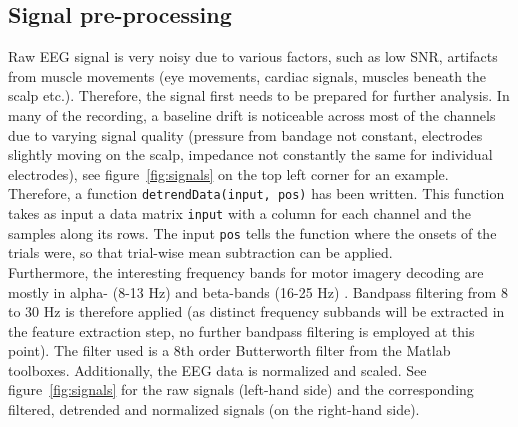 \documentclass[a4paper,oneside, openright,12pt]{report}
\begin{document}
\subsection{Signal pre-processing}
Raw EEG signal is very noisy due to various factors, such as low SNR, artifacts from muscle movements (eye movements, cardiac signals, muscles beneath the scalp etc.). Therefore, the signal first needs to be prepared for further analysis. In many of the recording, a baseline drift is noticeable across most of the channels due to varying signal quality (pressure from bandage not constant, electrodes slightly moving on the scalp, impedance not constantly the same for individual electrodes), see figure~\ref{fig:signals} on the top left corner for an example. Therefore, a function \texttt{detrendData(input, pos)} has been written. This function takes as input a data matrix \texttt{input} with a column for each channel and the samples along its rows. The input \texttt{pos} tells the function where the onsets of the trials were, so that trial-wise mean subtraction can be applied. \\
Furthermore, the interesting frequency bands for motor imagery decoding are mostly in alpha- (8-13 Hz) and beta-bands (16-25 Hz) \cite{ge2014classification}. Bandpass filtering from 8 to 30 Hz is therefore applied (as distinct frequency subbands will be extracted in the feature extraction step, no further bandpass filtering is employed at this point). The filter used is a 8th order Butterworth filter from the Matlab toolboxes. Additionally, the EEG data is normalized and scaled. See figure~\ref{fig:signals} for the raw signals (left-hand side) and the corresponding filtered, detrended and normalized signals (on the right-hand side). 
\end{document}
